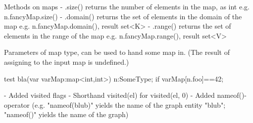 Methods on maps
- .size() returns the number of elements in the map, as int
 e.g. n.fancyMap.size()
- .domain() returns the set of elements in the domain of the map
 e.g. n.fancyMap.domain(), result set<K>
- .range() returns the set of elements in the range of the map
 e.g. n.fancyMap.range(), result set<V>

Parameters of map type, can be used to hand some map in.
(The result of assigning to the input map is undefined.)
\begin{grgen}
test bla(var varMap:map<int,int>) 
{
	n:SomeType;
	if {  varMap[n.foo]==42; }
}
\end{grgen}

- Added visited flags
- Shorthand visited(el) for visited(el, 0)
 - Added nameof()-operator
    (e.g. "nameof(blub)" yields the name of the graph entity "blub";
     "nameof()" yields the name of the graph)
